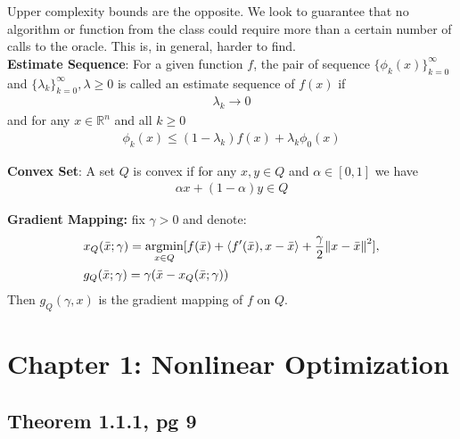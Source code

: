 \documentclass[12pt,a4paper]{article}
\DeclareMathOperator*{\argmin}{argmin}
\begin{document}
	Upper complexity bounds are the opposite. We look to guarantee that no algorithm or function from the class could require more than a certain number of calls to the oracle. This is, in general, harder to find. \\
	\textbf{Estimate Sequence}: For a given function $f$, the pair of sequence $\{\phi_k(x)\}_{k=0}^{\infty}$ and $\{\lambda_k\}_{k=0}^{\infty}, \lambda \geq 0$ is called an estimate sequence of $f(x)$ if
	\begin{align*}
		\lambda_k \rightarrow 0
	\end{align*}
	and for any $x \in \mathbb{R}^n$ and all $k \geq 0$
	\begin{align*}
		\phi_k(x) \leq (1-\lambda_k)f(x) + \lambda_k\phi_0(x)
	\end{align*}
	
	\textbf{Convex Set}: A set $Q$ is convex if for any $x,y \in Q$ and $\alpha \in [0,1]$ we have
	\begin{align*}
		\alpha x + (1 - \alpha)y \in Q
	\end{align*}
	
	\textbf{Gradient Mapping:} fix $\gamma > 0$ and denote:
	\begin{align*}
		&x_Q(\bar{x};\gamma) = \argmin_{x \in Q}[f(\bar{x}) + \langle f'(\bar{x}), x - \bar{x} \rangle + \frac{\gamma}{2}\norm{x - \bar{x}}^2], \\
		&g_Q(\bar{x}; \gamma) = \gamma(\bar{x} - x_Q(\bar{x};\gamma))
	\end{align*}
	Then $g_Q(\gamma,x)$ is the gradient mapping of $f$ on $Q$.
	
	\section*{Chapter 1: Nonlinear Optimization}\label{sec:Ch1}
	
	\subsection*{Theorem 1.1.1, pg 9}\label{ssec:thm111}
	
\end{document}
